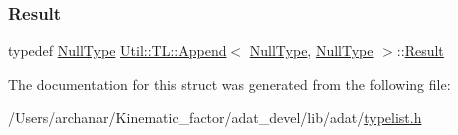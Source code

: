 \mbox{\label{structUtil_1_1TL_1_1Append_3_01NullType_00_01NullType_01_4_adc4800f4356ff026fe01fbcb9e2ce62f}} 
\subsubsection{\texorpdfstring{Result}{Result}\hspace{0.1cm}{\footnotesize\ttfamily [2/2]}}
{\footnotesize\ttfamily typedef \mbox{\hyperlink{classUtil_1_1NullType}{Null\+Type}} \mbox{\hyperlink{structUtil_1_1TL_1_1Append}{Util\+::\+T\+L\+::\+Append}}$<$ \mbox{\hyperlink{classUtil_1_1NullType}{Null\+Type}}, \mbox{\hyperlink{classUtil_1_1NullType}{Null\+Type}} $>$\+::\mbox{\hyperlink{structUtil_1_1TL_1_1Append_3_01NullType_00_01NullType_01_4_adc4800f4356ff026fe01fbcb9e2ce62f}{Result}}}



The documentation for this struct was generated from the following file\+:\begin{DoxyCompactItemize}
\item 
/\+Users/archanar/\+Kinematic\+\_\+factor/adat\+\_\+devel/lib/adat/\mbox{\hyperlink{lib_2adat_2typelist_8h}{typelist.\+h}}\end{DoxyCompactItemize}
